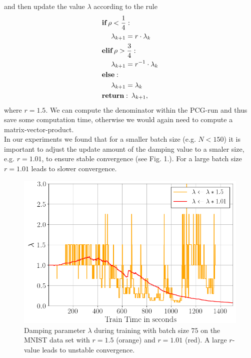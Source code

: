 \documentclass[conference]{IEEEtran}
\begin{document}
and then update the value $\lambda$ according to the rule
\begin{align}
&\textbf{if}\:\rho<\frac{1}{4}:\notag\\
&\text{ }\text{ }\text{ }\text{ }\lambda_{k+1} = r\cdot\lambda_{k}\notag\\
&\textbf{elif}\:\rho>\frac{3}{4}:\notag\\
&\text{ }\text{ }\text{ }\text{ }\lambda_{k + 1} = r^{-1}\cdot\lambda_{k}\notag\\
&\textbf{else}: \notag\\
&\text{ }\text{ }\text{ }\text{ }\lambda_{k + 1} = \lambda_{k}\notag\\
&\textbf{return}:\:\lambda_{k + 1},
\end{align}
where $r=1.5$. We can compute the denominator within the PCG-run and thus save some computation time, otherwise we would again need to compute a matrix-vector-product.\\
In our experiments we found that for a smaller batch size (e.g. $N<150$) it is important to adjust the update amount of the damping value to a smaler size, e.g. $r=1.01$, to ensure stable convergence (see Fig. 1.). For a large batch size $r=1.01$ leads to slower convergence.

\begin{figure}[htbp]
	\centerline{\includegraphics[scale=0.52]{lambda.png}}
	\caption{Damping parameter $\lambda$ during training with batch size $75$ on the MNIST data set with $r=1.5$ (orange) and $r=1.01$ (red). A large $r$-value leads to unstable convergence.}
	\label{fig}
\end{figure}
\end{document}
